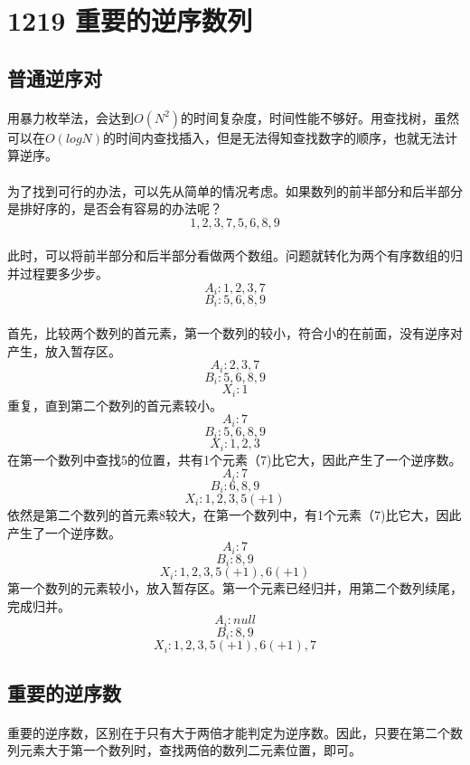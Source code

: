 \documentclass[UTF-8, 12pt]{ctexart}
\begin{document}
	    
\section{1219 重要的逆序数列}
	\subsection{普通逆序对}
    \paragraph{}
    用暴力枚举法，会达到$O(N^2)$的时间复杂度，时间性能不够好。用查找树，虽然可以在$O(logN)$的时间内查找插入，但是无法得知查找数字的顺序，也就无法计算逆序。
    \paragraph{}
    为了找到可行的办法，可以先从简单的情况考虑。如果数列的前半部分和后半部分是排好序的，是否会有容易的办法呢？
      \[1, 2, 3, 7, 5, 6, 8 ,9 \]
    \paragraph{}
    此时，可以将前半部分和后半部分看做两个数组。问题就转化为两个有序数组的归并过程要多少步。
    \[A_i: 1, 2, 3, 7 \] 
    \[B_i: 5, 6, 8 ,9 \]
    \paragraph{}
    首先，比较两个数列的首元素，第一个数列的较小，符合小的在前面，没有逆序对产生，放入暂存区。
    \[A_i: 2, 3, 7 \]
    \[B_i: 5, 6, 8 ,9 \]
    \[X_i: 1\]
    重复，直到第二个数列的首元素较小。
    \[A_i: 7 \]
    \[B_i: 5, 6, 8 ,9 \]
    \[X_i: 1, 2, 3\]
    在第一个数列中查找5的位置，共有1个元素（7)比它大，因此产生了一个逆序数。
    \[A_i: 7 \]
    \[B_i: 6, 8 ,9 \]
    \[X_i: 1, 2, 3, 5(+1)\]
    依然是第二个数列的首元素8较大，在第一个数列中，有1个元素（7)比它大，因此产生了一个逆序数。
    \[A_i: 7 \]
    \[B_i: 8 ,9 \]
    \[X_i: 1, 2, 3, 5(+1), 6(+1)\]
    第一个数列的元素较小，放入暂存区。第一个元素已经归并，用第二个数列续尾，完成归并。
    \[A_i: null \]
    \[B_i: 8 ,9 \]
    \[X_i: 1, 2, 3, 5(+1), 6(+1), 7\]
    \subsection{重要的逆序数}
    \paragraph{}
    重要的逆序数，区别在于只有大于两倍才能判定为逆序数。因此，只要在第二个数列元素大于第一个数列时，查找两倍的数列二元素位置，即可。
\end{document}
